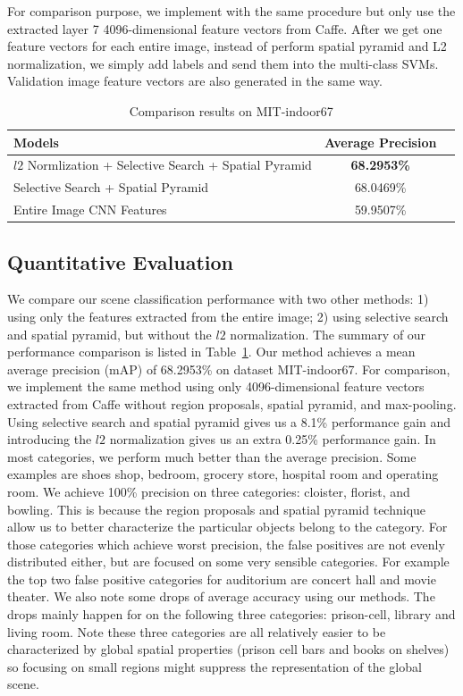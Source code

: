 For comparison purpose, we implement with the same procedure but only use
the extracted layer 7 4096-dimensional feature vectors from Caffe. After we get
one feature vectors for each entire image, instead of perform spatial pyramid
and L2 normalization, we simply add labels and send them into the multi-class
SVMs. Validation image feature vectors are also generated in the same way.

\begin{table}[ht]
        \caption{Comparison results on MIT-indoor67}
        \centering
        \begin{tabular}{l c c}
        \hline \hline
        Models                & Average Precision \\ \hline
        $l2$ Normlization + Selective Search + Spatial Pyramid & {\bf{68.2953\%}} \\
        Selective Search + Spatial Pyramid & 68.0469\% \\
        Entire Image CNN Features & 59.9507\% \\
        \hline
        \end{tabular}
        \label{tab:overall}
\end{table}

\subsection{Quantitative Evaluation}
We compare our scene classification performance with two other methods: 1) using only the
features extracted from the entire image; 2) using selective search and spatial pyramid, but without the
$l2$ normalization. The summary of our performance comparison is listed in Table~\ref{tab:overall}.
Our method achieves a mean average precision (mAP) of 68.2953\% on dataset
MIT-indoor67. For comparison, we implement the same method using only 4096-dimensional
feature vectors extracted from Caffe without region proposals, spatial pyramid, and max-pooling.
Using selective search and spatial pyramid gives us a 8.1\% performance gain and introducing
the $l2$ normalization gives us an extra 0.25\% performance gain. In most categories, we perform much
better than the average precision. Some examples are shoes shop, bedroom, grocery store, hospital room and operating
room. We achieve 100\% precision on three categories: cloister, florist, and bowling. This is because the region proposals and spatial pyramid technique
allow us to better characterize the particular objects belong to the category. For those categories which achieve worst precision, the false positives are
not evenly distributed either, but are focused on some very sensible categories. For example the top two false positive categories for auditorium are concert hall
and movie theater.
We also note some drops of average accuracy using our methods. The drops mainly happen for on the following three categories: prison-cell, library and living room.
Note these three categories are all relatively easier to be characterized by global spatial properties (prison cell bars and books on shelves) so focusing on small regions
might suppress the representation of the global scene.

